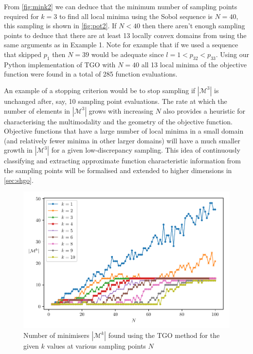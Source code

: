 From \autoref{fig:mink2} we can deduce that the minimum number of sampling points required for $k = 3$ to find all local minima using the Sobol sequence is $N = 40$, this sampling is shown in \autoref{fig:pot2}.  If  $N < 40$ then there aren't enough sampling points to deduce that there are at least 13 locally convex domains from using the same arguments as in Example 1. Note for example that if we used a sequence that skipped $p_1$ then $N =39$ would be adequate since $l = 1 < p_{32} < p_{33}$. Using our Python implementation of TGO \cite{TGOpy} with $N = 40$ all 13 local minima of the objective function were found in a total of 285 function evaluations. 

An example of a stopping criterion would be to stop sampling if $|\mathcal{M}^3|$ is unchanged after, say, 10 sampling point evaluations. The rate at which the number of elements in $|\mathcal{M}^3|$ grows with increasing $N$ also provides a heuristic for characterising the multimodality and the geometry of the objective function. Objective functions that have a large number of local minima in a small domain (and relatively fewer minima in other larger domains) will have a much smaller growth in $|\mathcal{M}^3|$ for a given low-discrepancy sampling. This idea of continuously classifying and extracting approximate function characteristic information from the sampling points will be formalised and extended to higher dimensions in \autoref{sec:shgo}.


\begin{figure}  \label{fig:mink2}
\centerline{\includegraphics[scale=0.8]{./Fig4.pdf}}
{\caption{Number of minimisers $|\mathcal{M}^k|$ found using the TGO method for the given $k$ values at various sampling points $N$}  \label{fig:mink2}}
\end{figure}

